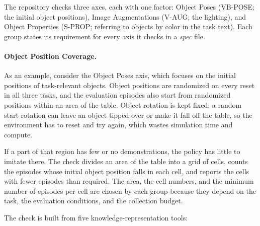 \documentclass[11pt]{article}
\begin{document}
The repository checks three axes, each with one factor: Object Poses (VB-POSE; the initial object positions), Image Augmentations (V-AUG; the lighting), and Object Properties (S-PROP; referring to objects by color in the task text). Each group states its requirement for every axis it checks in a \emph{spec} file.

\paragraph{Object Position Coverage.}
\label{sec:object-position-coverage-concept}
As an example, consider the Object Poses axis, which focuses on the initial positions of task-relevant objects. Object positions are randomized on every reset in all three tasks, and the evaluation episodes also start from randomized positions within an area of the table. Object rotation is kept fixed: a random start rotation can leave an object tipped over or make it fall off the table, so the environment has to reset and try again, which wastes simulation time and compute.

If a part of that region has few or no demonstrations, the policy has little to imitate there. The check divides an area of the table into a grid of cells, counts the episodes whose initial object position falls in each
cell, and reports the cells with fewer episodes than required. The area, the cell numbers, and the minimum number of
episodes per cell are chosen by each group because they depend on the task, the evaluation conditions, and the
collection budget.

The check is built from five knowledge-representation tools:
\end{document}
